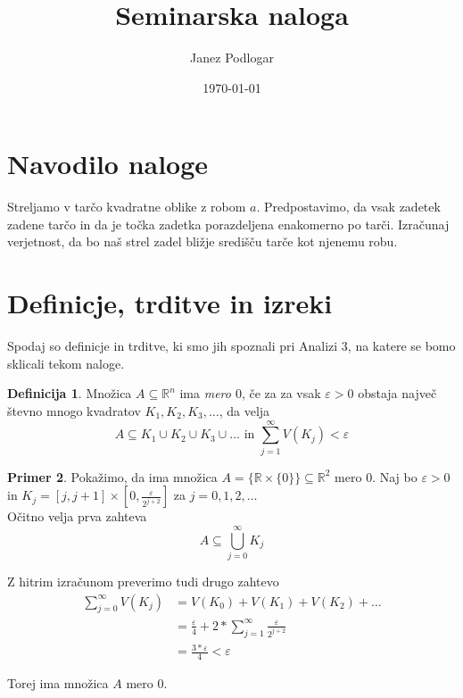 \documentclass{amsart}
\title{Seminarska naloga}
\author{Janez Podlogar}
\date{\today}
\newcommand{\R}{\mathbb{R}}
\theoremstyle{definition} %
\newtheorem{definicija}{Definicija}[section]
\newtheorem{primer}[definicija]{Primer}
\theoremstyle{plain} %
\begin{document}
\maketitle
\section{Navodilo naloge}
Streljamo v tarčo kvadratne oblike z robom $a$. Predpostavimo, da vsak zadetek zadene
tarčo in da je točka zadetka porazdeljena enakomerno po tarči. Izračunaj verjetnost, da
bo naš strel zadel bližje središču tarče kot njenemu robu.

\section{Definicje, trditve in izreki}
Spodaj so definicje in trditve, ki smo jih spoznali pri Analizi 3, na katere se bomo sklicali tekom naloge.
\begin{definicija}\label{def}
Množica $ A \subseteq \R^n $ ima \emph{mero $0$}, če za za vsak $\varepsilon > 0$ obstaja največ števno mnogo
kvadratov $K_1,K_2,K_3,\ldots$, da velja
\begin{equation*}
    A \subseteq K_1 \cup K_2 \cup K_3 \cup \ldots \text{ in } \sum_{j = 1}^{\infty} V(K_j) < \varepsilon
\end{equation*}
\end{definicija}

\begin{primer}\label{pri}
Pokažimo, da ima množica $A = \{ \R \times \{0\} \} \subseteq \R^2$ mero $0$.
Naj bo $ \varepsilon > 0 $ in $ K_j = \left[j,j+1\right] \times \left[0,\frac{\varepsilon}{2^{j+2}}\right] $ 
za $ j = 0,1,2,\ldots $ \\

Očitno velja prva zahteva
\begin{equation*}
    A \subseteq \bigcup_{j=0}^{\infty} K_{j}
\end{equation*}

Z hitrim izračunom preverimo tudi drugo zahtevo
\begin{align*}
    \sum_{j = 0}^{\infty} V(K_j) 
    &= V(K_0) + V(K_1) + V(K_2) + \ldots \\
    &= \frac{\varepsilon}{4} + 2 * \sum_{j = 1}^{\infty} \frac{\varepsilon}{2^{j+2}} \\
    &= \frac{3*\varepsilon}{4} < \varepsilon
\end{align*}

Torej ima množica $A$ mero $0$.

\end{primer}
\end{document}
